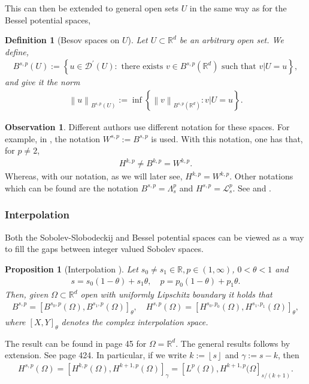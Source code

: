 \documentclass[
    a4paper,
    DIV=14,
    abstract=true,
    numbers=noenddot
]
{scrartcl}
\newtheorem{proposition}[theorem]{Proposition}
\newtheorem{definition}[theorem]{Definition}
\theoremstyle{definition}
\newtheorem{observation}{Observation}
\newcommand{\set}[1]{\left\{#1\right\}}
\renewcommand{\norm}[1]{\left\lVert #1 \right\rVert}\renewcommand{\abs}[1]{\left| #1 \right|}
\newcommand\restr[2]{\left.#1\right|{#2}}
\newcommand{\R}{\mathbb{R}}
\newcommand{\Ll}{\mathcal{L}}
\begin{document}
This can then be extended to general open sets $U$ in the same way as for the Bessel potential spaces,
\begin{definition}[Besov spaces on $U$]
  Let $U \subset \R^d$ be an arbitrary open set. We define,
  \begin{align*}
    B^{s,p}(U):=\left\{u \in \mathcal{D}^{\prime}(U): \text{ there exists } v \in B^{s,p}(\R^d) \text{ such that } \restr{v}{U}=u\right\},
  \end{align*}
  and give it the norm
  \begin{align*}
    \norm{u}_{B^{s,p}(U)}:= \inf \set{\norm{v}_{B^{s,p}(\R^d)}: \restr{v}{U}=u}.
  \end{align*}
\end{definition}
\begin{observation}
  Different authors use different notation for these spaces. For example, in \cite{triebel1992theory}, the notation $W^{s,p}:= B^{s,p}$ is used. With this notation, one has that, for $p \neq 2$,
  \begin{align*}
    H^{k,p} \neq B^{k,p}= W^{k,p}.
  \end{align*}
  Whereas, with our notation, as we will later see, $H^{k,p}=W^{k,p}$. Other notations which can be found are  the notation $B^{s,p}= \Lambda^{p}_s$ and $H^{s,p}= \Ll ^{p}_s$. See \cite{stein1970singular} and \cite{biccari2018local}.
\end{observation}
\subsubsection{Interpolation}
Both the Sobolev-Slobodeckij and Bessel potential spaces can be viewed as a way to fill the gaps between integer valued Sobolev spaces.
\begin{proposition}[Interpolation ]\label{interpolation}
  Let $s_0 \neq s_1 \in \R, p \in (1, \infty)$, $0<\theta<1$ and
  \begin{align*}
    s=s_0(1-\theta)+s_1 \theta, \quad p=p_0(1-\theta)+p_1 \theta.
  \end{align*}
  Then, given $\Omega \subset \R^d$ open with uniformly Lipschitz boundary it holds that
  \begin{align*}
    B^{s,p}=\left[B^{s_0,p}(\Omega ), B^{s_1, p}(\Omega )\right]_\theta,\quad H^{s,p}(\Omega )=\left[H^{s_0,p_0}(\Omega), H^{s_1,p_1}(\Omega)\right]_{\theta},
  \end{align*}
  where $[X,Y]_\theta$ denotes the complex interpolation space.
\end{proposition}
The result can be found in \cite{triebel1992theory} page 45 for $\Omega = \R^d$. The general results follows by extension. See \cite{leoni2017first} page 424. In particular, if we write $k:=\left\lfloor s \right\rfloor$ and $\gamma:=s-k$, then
\begin{align*}
  H^{s,p}(\Omega )=\left[H^{k,p}(\Omega), H^{k+1,p}(\Omega)\right]_{\gamma }= \left[L^p(\Omega ), H^{k+1,p}(\Omega\right]_{s/(k+1) }.
\end{align*}
\end{document}
